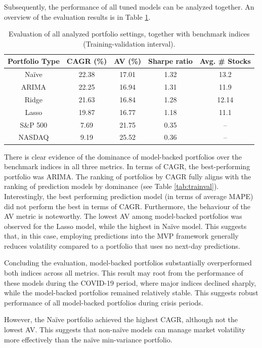Subsequently, the performance of all tuned models can be analyzed together. An overview of the evaluation results is in Table \ref{tab:eval}.

\begin{table}[H]
\centering
\begin{tabular}{|c|c|c|c|c|}
\hline
\textbf{Portfolio Type} & \textbf{CAGR (\%)} & \textbf{AV (\%)} & \textbf{Sharpe ratio} & \textbf{Avg. \# Stocks} \\
\hline
Naïve & 22.38 & 17.01 & 1.32& 13.2 \\ %
\hline
ARIMA & 22.25 & 16.94 & 1.31& 11.9 \\
\hline
Ridge & 21.63 & 16.84 & 1.28& 12.14 \\ %
\hline
Lasso & 19.87 & 16.77 & 1.18& 11.1 \\ %
\hline
\hline
S\&P 500 & 7.69 & 21.75 & 0.35& -- \\ %
\hline
NASDAQ & 9.19 & 25.52 & 0.36& -- \\ %
\hline
\end{tabular}
\caption{\centering Evaluation of all analyzed portfolio settings, together with benchmark indices (Training-validation interval).}
\label{tab:eval}
\end{table}

There is clear evidence of the dominance of model-backed portfolios over the benchmark indices in all three metrics. In terms of CAGR, the best-performing portfolio was ARIMA. The ranking of portfolios by CAGR 
fully aligns with the ranking of prediction models by dominance (see Table \ref{tab:trainval}). Interestingly, the best performing prediction model (in terms of average MAPE) did not perform the best in terms of CAGR.
Furthermore, the behaviour of the AV metric is noteworthy. The lowest AV among model-backed portfolios was observed for the Lasso model, while the highest in Naïve model. This suggests that, in this case, employing predictions into the MVP framework generally reduces volatility compared to a 
portfolio that uses no next-day predictions. 

Concluding the evaluation, model-backed portfolios substantially overperformed both indices across all metrics. This result may root from the performance of these models during the COVID-19 period, where major indices declined sharply, while the model-backed portfolios remained relatively stable.
This suggests robust performance of all model-backed portfolios during crisis periods. 

However, the Naïve portfolio achieved the highest CAGR, although not the lowest AV. This suggests that non-naïve models can manage market volatility more effectively than the naïve min-variance portfolio. 


